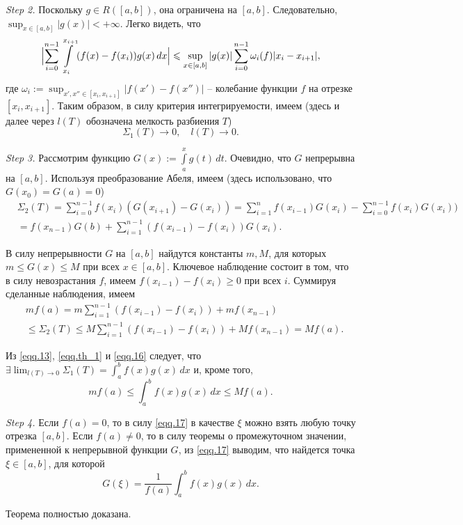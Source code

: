 \textit{Step 2.}
Поскольку $g \in R([a,b])$, она ограничена на $[a,b]$. Следовательно, $\sup_{x \in [a,b]}|g(x)| < +\infty$. Легко видеть, что
$$
\Bigl|\sum\limits_{i=0}^{n-1}\int\limits_{x_{i}}^{x_{i+1}}(f(x)-f(x_{i}))g(x)\,dx\Bigr| \le \sup_{x \in [a,b]}|g(x)|\sum\limits_{i=0}^{n-1}\omega_{i}(f)|x_{i}-x_{i+1}|,
$$
где $\omega_{i}:=\sup_{x',x'' \in [x_{i},x_{i+1}]}|f(x')-f(x'')|$ -- колебание функции $f$ на отрезке $[x_{i},x_{i+1}]$.
Таким образом, в силу критерия интегрируемости, имеем (здесь и далее через $l(T)$ обозначена мелкость разбиения $T$)
\begin{equation}
\label{eqq.th_1}
\Sigma_1(T) \to 0, \quad l(T) \to 0.
\end{equation}

\textit{Step 3.} Рассмотрим функцию $G(x):=\int\limits_{a}^{x}g(t)\,dt$. Очевидно, что $G$ непрерывна на $[a,b]$.
Используя преобразование Абеля, имеем (здесь использовано, что $G(x_{0})=G(a)=0$)
\begin{equation}
\begin{split}
\label{eqq.th_2}
&\Sigma_2(T) = \sum\limits_{i=0}^{n-1}f(x_{i})(G(x_{i+1})-G(x_{i})) = \sum\limits_{i=1}^{n}f(x_{i-1})G(x_{i})-\sum\limits_{i=0}^{n-1}f(x_{i})G(x_{i}))\\ 
&= f(x_{n-1})G(b)+
\sum\limits_{i=1}^{n-1}(f(x_{i-1})-f(x_{i}))G(x_{i}).
\end{split}
\end{equation}

В силу непрерывности $G$ на $[a,b]$ найдутся константы $m,M$, для которых $m \le G(x) \le M$ при всех $x \in [a,b]$.
Ключевое наблюдение состоит в том, что в силу невозрастания $f$, имеем $f(x_{i-1})-f(x_{i}) \geq 0$ при всех $i$.
Суммируя сделанные наблюдения, имеем
\begin{equation}
\label{eqq.16}
\begin{split}
&mf(a) = m \sum\limits_{i=1}^{n-1}(f(x_{i-1})-f(x_{i})) + mf(x_{n-1})\\ 
&\le  \Sigma_2(T) \le M \sum\limits_{i=1}^{n-1}(f(x_{i-1})-f(x_{i})) + Mf(x_{n-1}) = Mf(a).
\end{split}
\end{equation}

Из \eqref{eqq.13}, \eqref{eqq.th_1} и \eqref{eqq.16} следует, что $\exists \lim_{l(T) \to 0}\Sigma_{1}(T) = \int_{a}^{b}f(x)g(x)\,dx$ и, кроме того,
\begin{equation}
\label{eqq.17}
mf(a) \le \int_{a}^{b}f(x)g(x)\,dx \le Mf(a).
\end{equation}

\textit{Step 4.} Если $f(a) = 0$, то в силу \eqref{eqq.17} в качестве $\xi$ можно взять любую точку отрезка $[a,b]$. Если $f(a) \neq 0$, то в силу теоремы о промежуточном значении, примененной 
к непрерывной функции $G$, из \eqref{eqq.17} выводим, что найдется точка $\xi \in [a,b]$, для которой 
\begin{equation}
G(\xi) = \frac{1}{f(a)}\int_{a}^{b}f(x)g(x)\,dx.
\end{equation}

Теорема полностью доказана.
